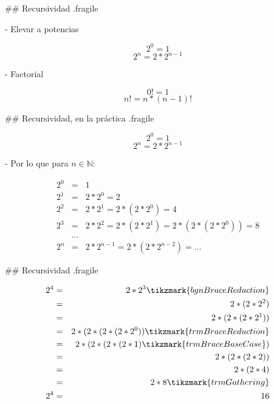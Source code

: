 ## Recursividad {.fragile}


- Elevar a potencias

$$ 2^0 = 1 $$
$$ 2^n = 2 * 2^{n-1} $$

- Factorial

$$ 0! = 1 $$
$$ n! = n * (n-1)! $$

## Recursividad, en la práctica {.fragile}


$$ 2^0 = 1 $$
$$ 2^n = 2 * 2^{n-1} $$

- Por lo que para $n \in \mathbb{N}$:

\begin{eqnarray*}
2^0 & = & 1 \\
2^1 & = & 2 * 2^0 = 2 \\
2^2 & = & 2 * 2^1 = 2 * (2 * 2^0) = 4 \\
2^3 & = & 2 * 2^2 = 2 * (2 * 2^1) = 2 * (2 * (2 * 2^0)) = 8\\
    & \ldots & \\
2^n & = & 2 * 2^{n-1} = 2 * (2 * 2^{n-2}) = \ldots
\end{eqnarray*}


## Recursividad {.fragile}


\vspace{-3ex}

\bgncolumns


\begin{eqnarray*}
2^4 & = & 2 * 2^3 \tikzmark{bgnBraceReduction} \\
    & = & 2 * (2 * 2^2) \\
    & = & 2 * (2 * (2 * 2^1)) \\
    & = & 2 * (2 * (2 * (2 * 2^0)) \tikzmark{trmBraceReduction} \\
    & = & 2 * (2 * (2 * (2 * 1) \tikzmark{trmBraceBaseCase}) \\
    & = & 2 * (2 * (2 * 2)) \\
    & = & 2 * (2 * 4) \\
    & = & 2 * 8 \tikzmark{trmGathering} \\
2^4 & = & 16 \\
\end{eqnarray*}


\trmcolumns

